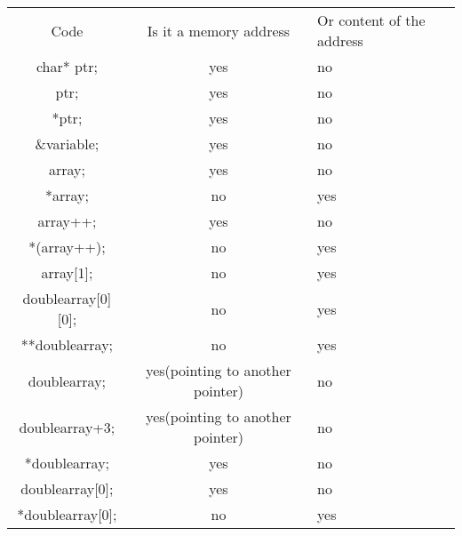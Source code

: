 \documentclass[a4paper]{article}
\begin{document}
\begin{table}[h]
\centering
\begin{tabular}{ccl}
Code                                           & Is it a memory address                               & Or content of the address \\
char* ptr;                                     & yes                                            & no                        \\
ptr;                                           & yes                                                  & no                        \\
*ptr;                                          & yes                                                  & no                        \\
\&variable;                                    & yes                                                  & no                        \\
array;                                         & yes                                                  & no                        \\
*array;                                        & no                                                   & yes                       \\
array++;                                       & yes                                                  & no                        \\
*(array++);                                    & no                                                   & yes                       \\
array{[}1{]};                                  & no                                                   & yes                       \\
doublearray{[}0{]}{[}0{]};					   & no						                              & yes                       \\
**doublearray;           					   & no						                              & yes                       \\
doublearray;               					   & yes(pointing to another pointer)				   	  & no                        \\
doublearray+3;             					   & yes(pointing to another pointer)                     & no                        \\
*doublearray;            					   & yes                         					      & no                        \\
doublearray{[}0{]};       					   & yes                             				 	  & no                        \\
*doublearray{[}0{]};    			      	   & no                              					  & yes                       \\                       
\end{tabular}
\end{table}
\end{document}
